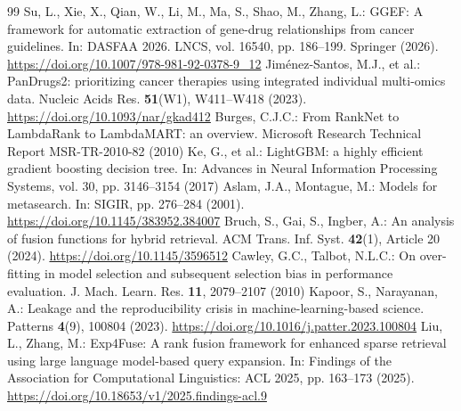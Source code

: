 \begin{thebibliography}{99}
Su, L., Xie, X., Qian, W., Li, M., Ma, S., Shao, M., Zhang, L.: GGEF: A framework for automatic extraction of gene-drug relationships from cancer guidelines. In: DASFAA 2026. LNCS, vol. 16540, pp. 186--199. Springer (2026). \url{https://doi.org/10.1007/978-981-92-0378-9_12}
Jim\'enez-Santos, M.J., et al.: PanDrugs2: prioritizing cancer therapies using integrated individual multi-omics data. Nucleic Acids Res. \textbf{51}(W1), W411--W418 (2023). \url{https://doi.org/10.1093/nar/gkad412}
Burges, C.J.C.: From RankNet to LambdaRank to LambdaMART: an overview. Microsoft Research Technical Report MSR-TR-2010-82 (2010)
Ke, G., et al.: LightGBM: a highly efficient gradient boosting decision tree. In: Advances in Neural Information Processing Systems, vol. 30, pp. 3146--3154 (2017)
Aslam, J.A., Montague, M.: Models for metasearch. In: SIGIR, pp. 276--284 (2001). \url{https://doi.org/10.1145/383952.384007}
Bruch, S., Gai, S., Ingber, A.: An analysis of fusion functions for hybrid retrieval. ACM Trans. Inf. Syst. \textbf{42}(1), Article 20 (2024). \url{https://doi.org/10.1145/3596512}
Cawley, G.C., Talbot, N.L.C.: On over-fitting in model selection and subsequent selection bias in performance evaluation. J. Mach. Learn. Res. \textbf{11}, 2079--2107 (2010)
Kapoor, S., Narayanan, A.: Leakage and the reproducibility crisis in machine-learning-based science. Patterns \textbf{4}(9), 100804 (2023). \url{https://doi.org/10.1016/j.patter.2023.100804}
Liu, L., Zhang, M.: Exp4Fuse: A rank fusion framework for enhanced sparse retrieval using large language model-based query expansion. In: Findings of the Association for Computational Linguistics: ACL 2025, pp. 163--173 (2025). \url{https://doi.org/10.18653/v1/2025.findings-acl.9}
\end{thebibliography}
